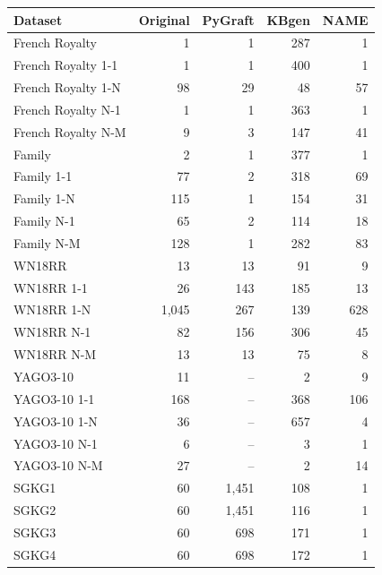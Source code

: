 \begin{tabular}{lrrrr}
\toprule
Dataset & Original & PyGraft & KBgen & NAME \\
\midrule
French Royalty & 1 & 1 & 287 & 1 \\
French Royalty 1-1 & 1 & 1 & 400 & 1 \\
French Royalty 1-N & 98 & 29 & 48 & 57 \\
French Royalty N-1 & 1 & 1 & 363 & 1 \\
French Royalty N-M & 9 & 3 & 147 & 41 \\
\midrule
Family & 2 & 1 & 377 & 1 \\
Family 1-1 & 77 & 2 & 318 & 69 \\
Family 1-N & 115 & 1 & 154 & 31 \\
Family N-1 & 65 & 2 & 114 & 18 \\
Family N-M & 128 & 1 & 282 & 83 \\
\midrule
WN18RR & 13 & 13 & 91 & 9 \\
WN18RR 1-1 & 26 & 143 & 185 & 13 \\
WN18RR 1-N & 1{,}045 & 267 & 139 & 628 \\
WN18RR N-1 & 82 & 156 & 306 & 45 \\
WN18RR N-M & 13 & 13 & 75 & 8 \\
\midrule
YAGO3-10 & 11 & – & 2 & 9 \\
YAGO3-10 1-1 & 168 & – & 368 & 106 \\
YAGO3-10 1-N & 36 & – & 657 & 4 \\
YAGO3-10 N-1 & 6 & – & 3 & 1 \\
YAGO3-10 N-M & 27 & – & 2 & 14 \\
\midrule
SGKG1 & 60 & 1{,}451 & 108 & 1 \\
SGKG2 & 60 & 1{,}451 & 116 & 1 \\
SGKG3 & 60 & 698 & 171 & 1 \\
SGKG4 & 60 & 698 & 172 & 1 \\
\bottomrule
\end{tabular}
